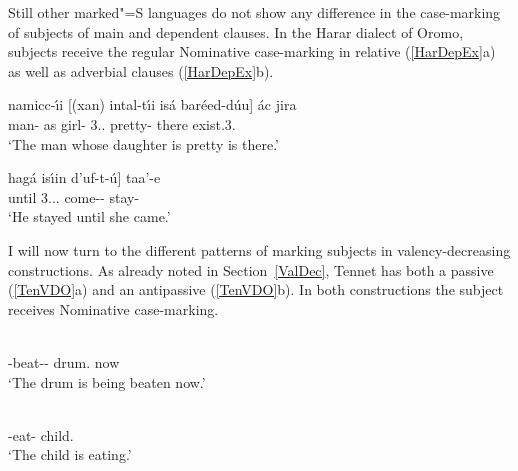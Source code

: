 Still other marked"=S languages do not show any difference in the case-marking of subjects of main and dependent clauses.
In the Harar dialect of Oromo, subjects receive the regular Nominative  case-marking in relative (\ref{HarDepEx}a) as well as adverbial clauses (\ref{HarDepEx}b).

\pagebreak
\begin{exe} \ex\label{HarDepEx}
\begin{xlist}
\ex\gll namicc-\'\i i  {\rm[}(xan) intal-t\'\i i is\'a bar\'eed-d\'uu{\rm]} \'ac jira\\
man-\nom{} \hspaceThis{[(}as girl-\nom{} 3\sg{}.\mas{}.\acc{} pretty-\fem{} there exist.3\sg{}.\mas{}\\
\glt `The man whose daughter is pretty is there.'

\ex\gll  {\rm[}hag\'a is\'\i in d'uf-t-\'u{\rm]} taa'-e\\
\hspaceThis{[}until 3.\sg{}.\fem{}.\nom{} come-\fem{}-\dep{} stay-\pst{}\\
\glt `He stayed until she came.'
\end{xlist}
\end{exe} 

I will now turn to the different patterns of marking subjects in valency-de\-crea\-sing constructions.  
As already noted in Section~\ref{ValDec},  
Tennet has both a passive (\ref{TenVDO}a) and an antipassive (\ref{TenVDO}b). 
In both constructions the subject receives Nominative  case-marking. 

\begin{exe}\ex\label{TenVDO}
\begin{xlist}
\ex\gll{}  \\
\ipfv{}-beat-\epen{}-\pass{} drum.\nom{} now\\
\glt `The drum is being beaten now.' 

\ex\gll{} \\
\ipfv{}-eat-\antip{} child.\nom{}\\
\glt `The child is eating.' 
\end{xlist}
\end{exe}

